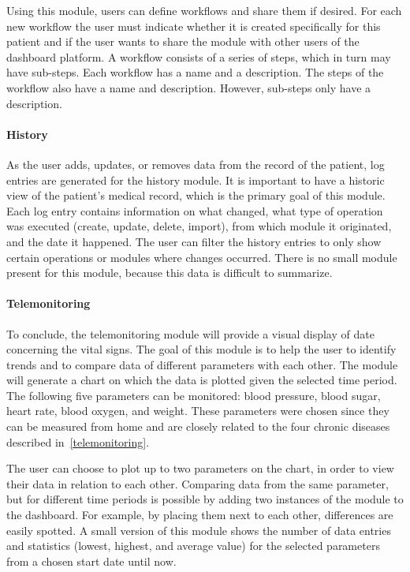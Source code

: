         Using this module, users can define workflows and share them if desired. For each new workflow the user must indicate whether it is created specifically for this patient and if the user wants to share the module with other users of the dashboard platform. A workflow consists of a series of steps, which in turn may have sub-steps. Each workflow has a name and a description. The steps of the workflow also have a name and description. However, sub-steps only have a description.

        \paragraph{History} As the user adds, updates, or removes data from the record of the patient, log entries are generated for the history module. It is important to have a historic view of the patient's medical record, which is the primary goal of this module. Each log entry contains information on what changed, what type of operation was executed (create, update, delete, import), from which module it originated, and the date it happened. The user can filter the history entries to only show certain operations or modules where changes occurred. There is no small module present for this module, because this data is difficult to summarize.

        \paragraph{Telemonitoring} To conclude, the telemonitoring module will provide a visual display of date concerning the vital signs. The goal of this module is to help the user to identify trends and to compare data of different parameters with each other. The module will generate a chart on which the data is plotted given the selected time period. The following five parameters can be monitored: blood pressure, blood sugar, heart rate, blood oxygen, and weight. These parameters were chosen since they can be measured from home and are closely related to the four chronic diseases described in~\ref{telemonitoring}.

        The user can choose to plot up to two parameters on the chart, in order to view their data in relation to each other. Comparing data from the same parameter, but for different time periods is possible by adding two instances of the module to the dashboard. For example, by placing them next to each other, differences are easily spotted. A small version of this module shows the number of data entries and statistics (lowest, highest, and average value) for the selected parameters from a chosen start date until now.